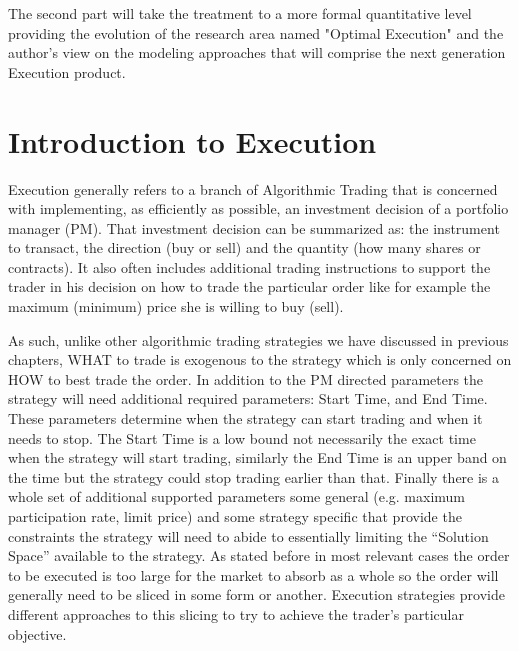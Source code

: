 The second part will take the treatment to a more formal quantitative level providing the evolution of the research area named "Optimal Execution" and the author's view on the modeling approaches that will comprise the next generation Execution product.


\section{Introduction to Execution}

Execution generally refers to a branch of Algorithmic Trading that is concerned with  implementing, as efficiently as possible, an investment decision of a portfolio manager (PM). That investment decision can be summarized as: the instrument to transact, the direction (buy or sell) and the quantity (how many shares or contracts). It also often includes additional trading instructions to support the trader in his decision on how to trade the particular order like for example the maximum (minimum) price she is willing to buy (sell). 

As such, unlike other algorithmic trading strategies we have discussed in previous chapters, WHAT to trade is exogenous to the strategy which is only concerned on HOW to best trade the order. In addition to the PM directed parameters the strategy will need additional  required parameters: Start Time, and End Time. These parameters determine when the strategy can start trading and when it needs to stop. The Start Time is a low bound not necessarily the exact time when the strategy will start trading, similarly the End Time is an upper band on the time but the strategy could stop trading earlier than that. Finally there is a whole set of additional supported parameters some general (e.g. maximum participation rate, limit price) and some strategy specific that provide the constraints the strategy will need to abide to essentially limiting the ``Solution Space'' available to the strategy.
As stated before in most relevant cases the order to be executed is too large for the market to absorb as a whole so the order will generally need to be sliced in some form or another. Execution strategies provide different approaches to this slicing to try to achieve the trader's particular objective. \\

